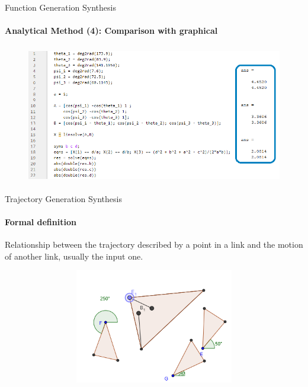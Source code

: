 \documentclass[aspectratio=169]{beamer}
\begin{document}
\begin{frame}[t]{Function Generation Synthesis}
    \framesubtitle{Analytical Method (4): Comparison with graphical}
    \vspace{-0.7cm}
    \begin{figure}[H]
        \centering\includegraphics[height=6cm,width=1\textwidth,keepaspectratio]{func_gen11.png}
        \label{fig:func_gen11.png}
    \end{figure}
\end{frame}

\begin{frame}[t]{Trajectory Generation Synthesis}
\framesubtitle{Formal definition}
\vspace{-0.5cm}

Relationship between the trajectory described by a point in a link and the motion of another link, usually the input one.
\vspace{-0.5cm}

\begin{figure}[H]
    \href{https://www.geogebra.org/m/SF2rQXEp}{
        \centering\includegraphics[height=5cm,width=1\textwidth,keepaspectratio]{traj_gen2.png}}
    \label{fig:traj_gen2.png}
\end{figure}
\end{frame}
\end{document}
